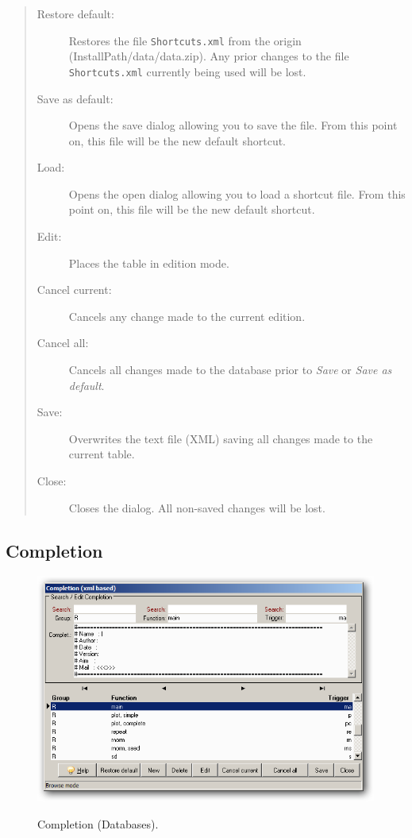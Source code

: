 \begin{quote}
  \begin{footnotesize}
    \begin{description}
      \item[Restore default:]
        Restores the file \texttt{Shortcuts.xml} from the origin
        (InstallPath/data/data.zip). Any prior changes to the file
        \texttt{Shortcuts.xml} currently being used will be lost.
      \item[Save as default:]
        Opens the save dialog allowing you to save the file. From
        this point on, this file will be the new default shortcut.
      \item[Load:]
        Opens the open dialog allowing you to load a shortcut file.
        From this point on, this file will be the new default shortcut.
      \item[Edit:]
        Places the table in edition mode.
      \item[Cancel current:]
        Cancels any change made to the current edition.
      \item[Cancel all:]
        Cancels all changes made to the database prior to \textit{Save} or \textit{Save as default}.
      \item[Save:]
        Overwrites the text file (XML) saving all changes made to the current table.
      \item[Close:]
        Closes the dialog. All non-saved changes will be lost.
    \end{description}
  \end{footnotesize}
\end{quote}


\subsection{Completion}

\begin{figure}[h!]
  \includegraphics[scale=0.35]{./res/completion_dlg.png}\\
  \caption{Completion (Databases).}
  \label{fig:completion_dlg}
\end{figure}

